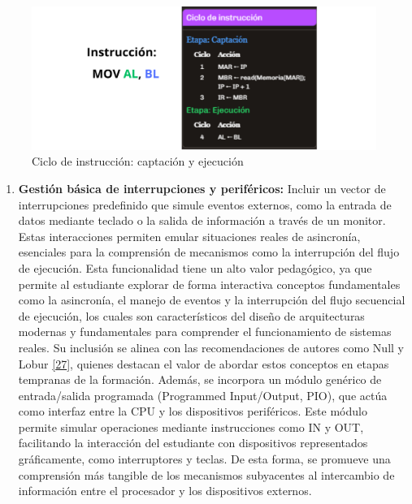 \documentclass[12pt,oneside]{templates/unerthesis}
\providecommand{\tightlist}{%
  \setlength{\itemsep}{0pt}\setlength{\parskip}{0pt}}
\begin{document}
\begin{figure}

{\centering \includegraphics[width=0.85\linewidth]{images/cicloinstruccion} 

}

\caption{Ciclo de instrucción: captación y ejecución}\label{fig:cicloinstruccion}
\end{figure}

\begin{enumerate}
\def\labelenumi{\arabic{enumi}.}
\setcounter{enumi}{4}
\tightlist
\item
  \textbf{Gestión básica de interrupciones y periféricos:}
  Incluir un vector de interrupciones predefinido que simule eventos externos, como la entrada de datos mediante teclado o la salida de información a través de un monitor. Estas interacciones permiten emular situaciones reales de asincronía, esenciales para la comprensión de mecanismos como la interrupción del flujo de ejecución. Esta funcionalidad tiene un alto valor pedagógico, ya que permite al estudiante explorar de forma interactiva conceptos fundamentales como la asincronía, el manejo de eventos y la interrupción del flujo secuencial de ejecución, los cuales son característicos del diseño de arquitecturas modernas y fundamentales para comprender el funcionamiento de sistemas reales. Su inclusión se alinea con las recomendaciones de autores como Null y Lobur \protect\hyperlink{ref-null_essentials_2023}{{[}27{]}}, quienes destacan el valor de abordar estos conceptos en etapas tempranas de la formación. Además, se incorpora un módulo genérico de entrada/salida programada (Programmed Input/Output, PIO), que actúa como interfaz entre la CPU y los dispositivos periféricos. Este módulo permite simular operaciones mediante instrucciones como IN y OUT, facilitando la interacción del estudiante con dispositivos representados gráficamente, como interruptores y teclas. De esta forma, se promueve una comprensión más tangible de los mecanismos subyacentes al intercambio de información entre el procesador y los dispositivos externos.
\end{enumerate}
\end{document}
